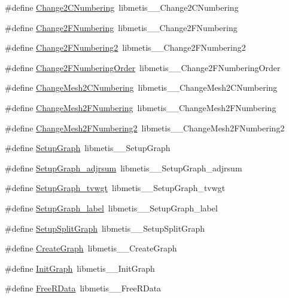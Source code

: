 \begin{DoxyCompactItemize}
\item 
\#define \hyperlink{a00957_a0e6f90d7b0e8153fcf80e5006e14b5fa}{Change2\+C\+Numbering}~libmetis\+\_\+\+\_\+\+Change2\+C\+Numbering
\item 
\#define \hyperlink{a00957_a6a9121caea8a404ae58b2c54cf7e1fcf}{Change2\+F\+Numbering}~libmetis\+\_\+\+\_\+\+Change2\+F\+Numbering
\item 
\#define \hyperlink{a00957_a5f4e131537e5b14d9f89601be847df7d}{Change2\+F\+Numbering2}~libmetis\+\_\+\+\_\+\+Change2\+F\+Numbering2
\item 
\#define \hyperlink{a00957_a1cb5042ccd3d7eebb361f1196b7badee}{Change2\+F\+Numbering\+Order}~libmetis\+\_\+\+\_\+\+Change2\+F\+Numbering\+Order
\item 
\#define \hyperlink{a00957_ad93e96124ea8cdcaf5f497d0e90fdab3}{Change\+Mesh2\+C\+Numbering}~libmetis\+\_\+\+\_\+\+Change\+Mesh2\+C\+Numbering
\item 
\#define \hyperlink{a00957_a263e88876d2cfe6bb0f7dc3e2b33dd58}{Change\+Mesh2\+F\+Numbering}~libmetis\+\_\+\+\_\+\+Change\+Mesh2\+F\+Numbering
\item 
\#define \hyperlink{a00957_a2a19edebc06465a5f607f4fade8f9170}{Change\+Mesh2\+F\+Numbering2}~libmetis\+\_\+\+\_\+\+Change\+Mesh2\+F\+Numbering2
\item 
\#define \hyperlink{a00957_a87e626056c844391adf0e3ea0f51d303}{Setup\+Graph}~libmetis\+\_\+\+\_\+\+Setup\+Graph
\item 
\#define \hyperlink{a00957_aaead8148647a68986fe81a79f27b1e6c}{Setup\+Graph\+\_\+adjrsum}~libmetis\+\_\+\+\_\+\+Setup\+Graph\+\_\+adjrsum
\item 
\#define \hyperlink{a00957_ae11d850d279a042e79c3f32a32f9501c}{Setup\+Graph\+\_\+tvwgt}~libmetis\+\_\+\+\_\+\+Setup\+Graph\+\_\+tvwgt
\item 
\#define \hyperlink{a00957_aab9ed4677876c2df336ea5400410ae9d}{Setup\+Graph\+\_\+label}~libmetis\+\_\+\+\_\+\+Setup\+Graph\+\_\+label
\item 
\#define \hyperlink{a00957_a6e695ac076a9df7af4284fde86be8e91}{Setup\+Split\+Graph}~libmetis\+\_\+\+\_\+\+Setup\+Split\+Graph
\item 
\#define \hyperlink{a00957_a9f98f0bd10eaa718b4a9d033cc5d5e24}{Create\+Graph}~libmetis\+\_\+\+\_\+\+Create\+Graph
\item 
\#define \hyperlink{a00957_a9b657db42e7bd21fca4dcff53f76d445}{Init\+Graph}~libmetis\+\_\+\+\_\+\+Init\+Graph
\item 
\#define \hyperlink{a00957_a2e8fc724c3be5802582c2dba3b45d5e9}{Free\+R\+Data}~libmetis\+\_\+\+\_\+\+Free\+R\+Data

\end{DoxyCompactItemize}

